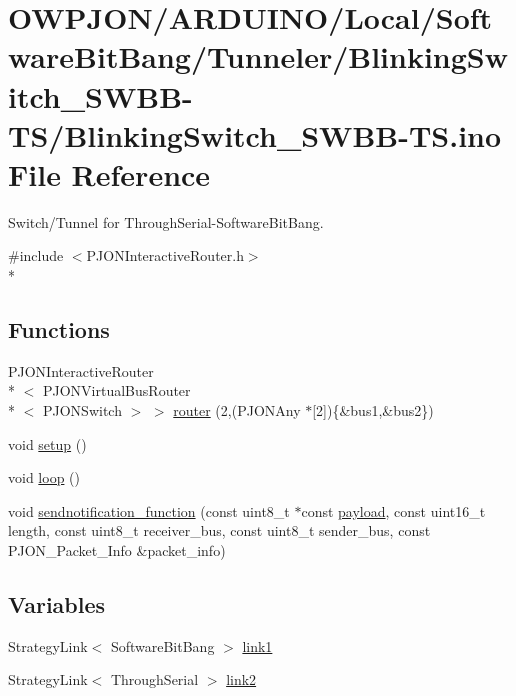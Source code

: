 \hypertarget{BlinkingSwitch__SWBB-TS_8ino}{\section{O\-W\-P\-J\-O\-N/\-A\-R\-D\-U\-I\-N\-O/\-Local/\-Software\-Bit\-Bang/\-Tunneler/\-Blinking\-Switch\-\_\-\-S\-W\-B\-B-\/\-T\-S/\-Blinking\-Switch\-\_\-\-S\-W\-B\-B-\/\-T\-S.ino File Reference}
\label{BlinkingSwitch__SWBB-TS_8ino}
}


Switch/\-Tunnel for Through\-Serial-\/\-Software\-Bit\-Bang.  


{\ttfamily \#include $<$P\-J\-O\-N\-Interactive\-Router.\-h$>$}\\*
\subsection*{Functions}
\begin{DoxyCompactItemize}
\item 
P\-J\-O\-N\-Interactive\-Router\\*
$<$ P\-J\-O\-N\-Virtual\-Bus\-Router\\*
$<$ P\-J\-O\-N\-Switch $>$ $>$ \hyperlink{BlinkingSwitch__SWBB-TS_8ino_a8c8a35b003b9467f7f3b1a828c90a5b5}{router} (2,(P\-J\-O\-N\-Any $\ast$\mbox{[}2\mbox{]})\{\&bus1,\&bus2\})
\item 
void \hyperlink{BlinkingSwitch__SWBB-TS_8ino_a4fc01d736fe50cf5b977f755b675f11d}{setup} ()
\item 
void \hyperlink{BlinkingSwitch__SWBB-TS_8ino_afe461d27b9c48d5921c00d521181f12f}{loop} ()
\item 
void \hyperlink{BlinkingSwitch__SWBB-TS_8ino_af488e931618139cd40b126dabfe9b6bb}{sendnotification\-\_\-function} (const uint8\-\_\-t $\ast$const \hyperlink{Uno__Dragino__LoRa__GPS__Shield__TTN_8ino_a78a402d1762842473567de90b11ed256}{payload}, const uint16\-\_\-t length, const uint8\-\_\-t receiver\-\_\-bus, const uint8\-\_\-t sender\-\_\-bus, const P\-J\-O\-N\-\_\-\-Packet\-\_\-\-Info \&packet\-\_\-info)
\end{DoxyCompactItemize}
\subsection*{Variables}
\begin{DoxyCompactItemize}
\item 
Strategy\-Link$<$ Software\-Bit\-Bang $>$ \hyperlink{BlinkingSwitch__SWBB-TS_8ino_ae2f4f4a5ca9a8a627a5132d1868bf5c0}{link1}
\item 
Strategy\-Link$<$ Through\-Serial $>$ \hyperlink{BlinkingSwitch__SWBB-TS_8ino_a6ab0c6e3e6ae04f06e58b38531729623}{link2}
\end{DoxyCompactItemize}


